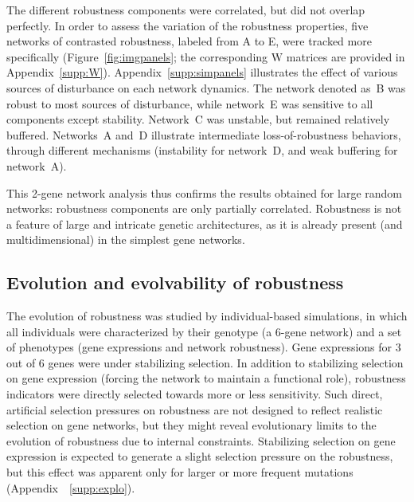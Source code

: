 \documentclass[10pt,a4paper]{article}
\newcommand{\W}{\bm{\mathrm W}}
\newcommand{\SupMat}{Appendix~}
\begin{document}
The different robustness components were correlated, but did not overlap perfectly. In order to assess the variation of the robustness properties, five networks of contrasted robustness, labeled from A to E, were tracked more specifically (Figure~\ref{fig:imgpanels}; the corresponding $\W$ matrices are provided in \SupMat \ref{supp:W}). \SupMat \ref{supp:simpanels} illustrates the effect of various sources of disturbance on each network dynamics. The network denoted as~B was robust to most sources of disturbance, while network~E was sensitive to all components except stability. Network~C was unstable, but remained relatively buffered. Networks~A and~D illustrate intermediate loss-of-robustness behaviors, through different mechanisms (instability for network~D, and weak buffering for network~A). 

This 2-gene network analysis thus confirms the results obtained for large random networks: robustness components are only partially correlated. Robustness is not a feature of large and intricate genetic architectures, as it is already present (and multidimensional) in the simplest gene networks. 

\subsection{Evolution and evolvability of robustness}

The evolution of robustness was studied by individual-based simulations, in which all individuals were characterized by their genotype (a 6-gene network) and a set of phenotypes (gene expressions and network robustness). Gene expressions for 3 out of 6 genes were under stabilizing selection. In addition to stabilizing selection on gene expression (forcing the network to maintain a functional role), robustness indicators were directly selected towards more or less sensitivity. Such direct, artificial selection pressures on robustness are not designed to reflect realistic selection on gene networks, but they might reveal evolutionary limits to the evolution of robustness due to internal constraints. Stabilizing selection on gene expression is expected to generate a slight selection pressure on the robustness, but this effect was apparent only for larger or more frequent mutations (\SupMat~\ref{supp:explo}). 
\end{document}
